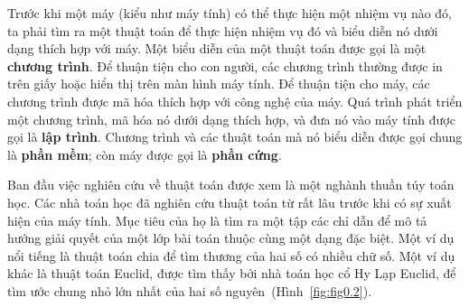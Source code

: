 




Trước khi một máy (kiểu như máy tính) có thể thực hiện một nhiệm vụ nào đó, ta phải tìm ra
một thuật toán để thực hiện nhiệm vụ đó và biểu diễn nó dưới dạng thích hợp với máy. Một
biểu diễn của một thuật toán được gọi là một \textbf{chương trình}. Để thuận tiện cho con
người, các chương trình  thường được in trên giấy hoặc hiển thị trên màn hình máy
tính. Để thuận tiện cho máy, các chương trình được mã hóa thích hợp với công
nghệ của máy. Quá trình phát triển một chương trình, mã hóa nó dưới dạng thích hợp, và đưa nó vào máy tính được gọi là \textbf{lập trình}. Chương trình và các thuật
toán mà nó biểu diễn được gọi chung là \textbf{phần mềm}; còn máy được gọi là
\textbf{phần cứng}.

Ban đầu việc nghiên cứu về thuật toán được xem là một nghành thuần túy toán học.  Các nhà toán học đã nghiên cứu thuật toán từ rất lâu trước khi có sự xuất hiện của máy tính. Mục tiêu của họ
là tìm ra một tập các chỉ dẫn để mô tả hướng giải quyết của một lớp bài toán thuộc cùng
một dạng đặc biệt. Một ví dụ nổi tiếng  là
thuật toán chia để tìm thương của hai số có nhiều chữ số. Một ví dụ khác là thuật toán
Euclid, được tìm thấy bởi nhà toán học cổ Hy Lạp Euclid, để tìm ước chung nhỏ lớn nhất của
hai số nguyên~(Hình~\ref{fig:fig0.2}).

